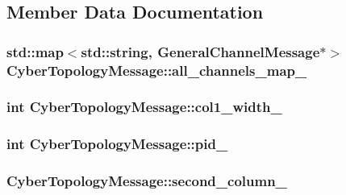 \subsection{Member Data Documentation}
\hypertarget{classCyberTopologyMessage_a982b69f726e8f42a1c3a0389865d84f8}{
\subsubsection[{all\-\_\-channels\-\_\-map\-\_\-}]{\setlength{\rightskip}{0pt plus 5cm}std\-::map$<$std\-::string, {\bf General\-Channel\-Message}$\ast$$>$ Cyber\-Topology\-Message\-::all\-\_\-channels\-\_\-map\-\_\-\hspace{0.3cm}{\ttfamily [private]}}}\label{classCyberTopologyMessage_a982b69f726e8f42a1c3a0389865d84f8}
\hypertarget{classCyberTopologyMessage_ac3a5fef5a512872150261b3c32fafc60}{
\subsubsection[{col1\-\_\-width\-\_\-}]{\setlength{\rightskip}{0pt plus 5cm}int Cyber\-Topology\-Message\-::col1\-\_\-width\-\_\-\hspace{0.3cm}{\ttfamily [private]}}}\label{classCyberTopologyMessage_ac3a5fef5a512872150261b3c32fafc60}
\hypertarget{classCyberTopologyMessage_a3cc7dce72601c852f9f602f242b72e73}{
\subsubsection[{pid\-\_\-}]{\setlength{\rightskip}{0pt plus 5cm}int Cyber\-Topology\-Message\-::pid\-\_\-\hspace{0.3cm}{\ttfamily [private]}}}\label{classCyberTopologyMessage_a3cc7dce72601c852f9f602f242b72e73}
\hypertarget{classCyberTopologyMessage_a1154eec678920dfada21e1f406dc28d0}{
\subsubsection[{second\-\_\-column\-\_\-}]{ Cyber\-Topology\-Message\-::second\-\_\-column\-\_\-\hspace{0.3cm}{\ttfamily [private]}}}\label{classCyberTopologyMessage_a1154eec678920dfada21e1f406dc28d0}
